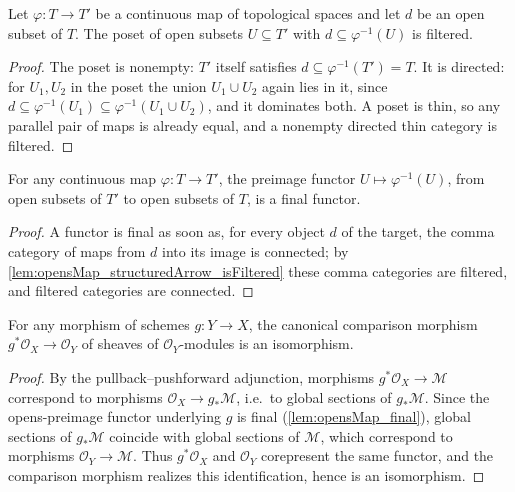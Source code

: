 \begin{lemma}
  \label{lem:opensMap_structuredArrow_isFiltered}
  Let \(\varphi : T \to T'\) be a continuous map of topological spaces and let \(d\) be an
  open subset of \(T\). The poset of open subsets \(U \subseteq T'\) with
  \(d \subseteq \varphi^{-1}(U)\) is filtered.
\end{lemma}
\begin{proof}\leanok
  The poset is nonempty: \(T'\) itself satisfies \(d \subseteq \varphi^{-1}(T') = T\). It is
  directed: for \(U_1, U_2\) in the poset the union \(U_1 \cup U_2\) again lies in it, since
  \(d \subseteq \varphi^{-1}(U_1) \subseteq \varphi^{-1}(U_1 \cup U_2)\), and it dominates
  both. A poset is thin, so any parallel pair of maps is already equal, and a nonempty
  directed thin category is filtered.
\end{proof}

\begin{lemma}
  \label{lem:opensMap_final}
  For any continuous map \(\varphi : T \to T'\), the preimage functor
  \(U \mapsto \varphi^{-1}(U)\), from open subsets of \(T'\) to open subsets of \(T\), is a
  final functor.
\end{lemma}
\begin{proof}\leanok
  A functor is final as soon as, for every object \(d\) of the target, the comma category of
  maps from \(d\) into its image is connected; by
  \cref{lem:opensMap_structuredArrow_isFiltered} these comma categories are filtered, and
  filtered categories are connected.
\end{proof}

\begin{lemma}
  \label{lem:module_pullback_unit_iso}
  For any morphism of schemes \(g : Y \to X\), the canonical comparison morphism
  \(g^*\mathcal{O}_X \to \mathcal{O}_Y\) of sheaves of \(\mathcal{O}_Y\)-modules is an
  isomorphism.
\end{lemma}
\begin{proof}\leanok
  By the pullback--pushforward adjunction, morphisms \(g^*\mathcal{O}_X \to \mathcal{M}\)
  correspond to morphisms \(\mathcal{O}_X \to g_*\mathcal{M}\), i.e.\ to global sections of
  \(g_*\mathcal{M}\). Since the opens-preimage functor underlying \(g\) is final
  (\cref{lem:opensMap_final}), global sections of \(g_*\mathcal{M}\) coincide with global
  sections of \(\mathcal{M}\), which correspond to morphisms \(\mathcal{O}_Y \to \mathcal{M}\).
  Thus \(g^*\mathcal{O}_X\) and \(\mathcal{O}_Y\) corepresent the same functor, and the
  comparison morphism realizes this identification, hence is an isomorphism.
\end{proof}

